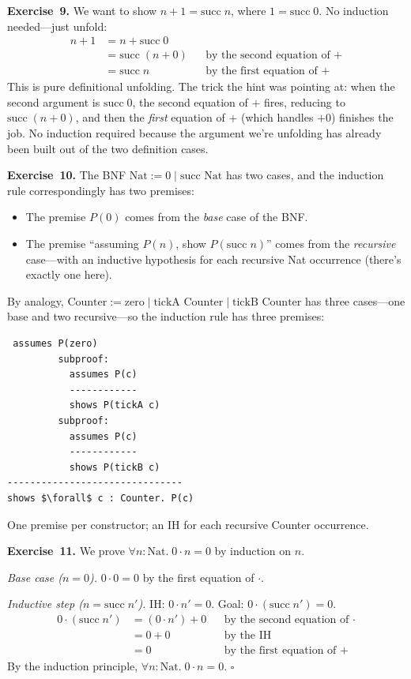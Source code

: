 \documentclass[11pt]{article}
\begin{document}
\textbf{Exercise~9.}
We want to show $n + 1 = \text{succ}\; n$, where $1 = \text{succ}\; 0$. No induction needed---just unfold:
\begin{align*}
  n + 1 &= n + \text{succ}\; 0 \\
        &= \text{succ}\;(n + 0) && \text{by the second equation of +} \\
        &= \text{succ}\; n      && \text{by the first equation of +}
\end{align*}
This is pure definitional unfolding. The trick the hint was pointing at: when the second argument is $\text{succ}\; 0$, the second equation of $+$ fires, reducing to $\text{succ}\;(n + 0)$, and then the \emph{first} equation of $+$ (which handles $+ 0$) finishes the job. No induction required because the argument we're unfolding has already been built out of the two definition cases.

\medskip
\textbf{Exercise~10.}
The BNF $\text{Nat} := 0 \mid \text{succ Nat}$ has two cases, and the induction rule correspondingly has two premises:
\begin{itemize}
  \item The premise $P(0)$ comes from the \emph{base} case of the BNF.
  \item The premise ``assuming $P(n)$, show $P(\text{succ}\; n)$'' comes from the \emph{recursive} case---with an inductive hypothesis for each recursive Nat occurrence (there's exactly one here).
\end{itemize}
By analogy, $\text{Counter} := \text{zero} \mid \text{tickA Counter} \mid \text{tickB Counter}$ has three cases---one base and two recursive---so the induction rule has three premises:
\begin{lstlisting}
 assumes P(zero)
         subproof:
           assumes P(c)
           ------------
           shows P(tickA c)
         subproof:
           assumes P(c)
           ------------
           shows P(tickB c)
-------------------------------
shows $\forall$ c : Counter. P(c)
\end{lstlisting}
One premise per constructor; an IH for each recursive Counter occurrence.

\medskip
\textbf{Exercise~11.}
We prove $\forall n : \text{Nat}.\; 0 \cdot n = 0$ by induction on $n$.

\emph{Base case ($n = 0$).} $0 \cdot 0 = 0$ by the first equation of $\cdot$. \checkmark

\emph{Inductive step ($n = \text{succ}\; n'$).} IH: $0 \cdot n' = 0$. Goal: $0 \cdot (\text{succ}\; n') = 0$.
\begin{align*}
  0 \cdot (\text{succ}\; n') &= (0 \cdot n') + 0 && \text{by the second equation of $\cdot$} \\
                             &= 0 + 0            && \text{by the IH} \\
                             &= 0                && \text{by the first equation of $+$}
\end{align*}
By the induction principle, $\forall n : \text{Nat}.\; 0 \cdot n = 0$. \hfill$\square$
\end{document}
